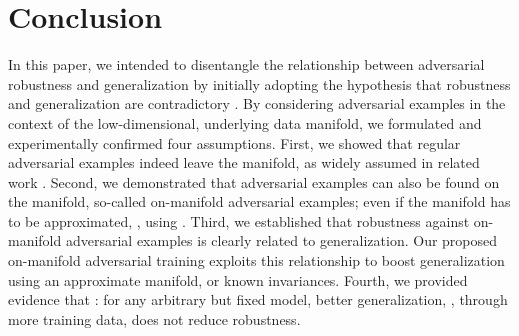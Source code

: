 \section{Conclusion}
\label{sec:conclusion}

In this paper, we intended to disentangle the relationship between adversarial robustness and generalization by initially adopting the hypothesis that robustness and generalization are contradictory \cite{TsiprasARXIV2018,SuARXV2018}. By considering adversarial examples in the context of the low-dimensional, underlying data manifold, we formulated and experimentally confirmed four assumptions. First, we showed that regular adversarial examples indeed leave the manifold, as widely assumed in related work \cite{GilmerICLRWORK2018,TanayARXIV2016,IlyasARXIV2017,SamangoueiICLR2018,SchottARXIV2018}. Second, we demonstrated that adversarial examples can also be found on the manifold, so-called on-manifold adversarial examples; even if the manifold has to be approximated, \eg, using \VAEGANs \cite{LarsenICML2016,RoscaARXIV2017}. Third, we established that robustness against on-manifold adversarial examples is clearly related to generalization. Our proposed on-manifold adversarial training exploits this relationship to boost generalization using an approximate manifold, or known invariances. Fourth, we provided evidence that : for any arbitrary but fixed model, better generalization, \eg, through more training data, does not reduce robustness.